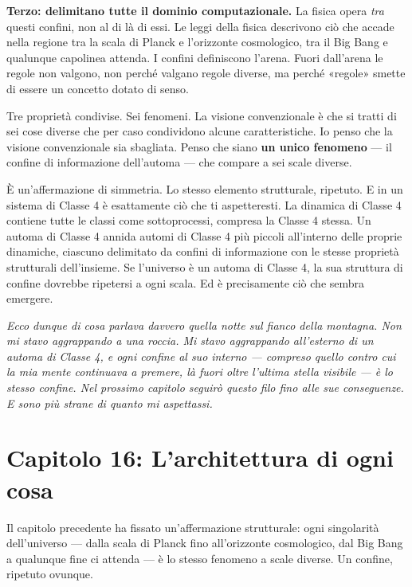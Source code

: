 \documentclass[11pt, twoside, openright]{book}
\begin{document}
\textbf{Terzo: delimitano tutte il dominio computazionale.} La fisica opera \textit{tra} questi confini, non al di là di essi. Le leggi della fisica descrivono ciò che accade nella regione tra la scala di Planck e l'orizzonte cosmologico, tra il Big Bang e qualunque capolinea attenda. I confini definiscono l'arena. Fuori dall'arena le regole non valgono, non perché valgano regole diverse, ma perché «regole» smette di essere un concetto dotato di senso.

Tre proprietà condivise. Sei fenomeni. La visione convenzionale è che si tratti di sei cose diverse che per caso condividono alcune caratteristiche. Io penso che la visione convenzionale sia sbagliata. Penso che siano \textbf{un unico fenomeno} --- il confine di informazione dell'automa --- che compare a sei scale diverse.

È un'affermazione di simmetria. Lo stesso elemento strutturale, ripetuto. E in un sistema di Classe 4 è esattamente ciò che ti aspetteresti. La dinamica di Classe 4 contiene tutte le classi come sottoprocessi, compresa la Classe 4 stessa. Un automa di Classe 4 annida automi di Classe 4 più piccoli all'interno delle proprie dinamiche, ciascuno delimitato da confini di informazione con le stesse proprietà strutturali dell'insieme. Se l'universo è un automa di Classe 4, la sua struttura di confine dovrebbe ripetersi a ogni scala. Ed è precisamente ciò che sembra emergere.


\textit{Ecco dunque di cosa parlava davvero quella notte sul fianco della montagna. Non mi stavo aggrappando a una roccia. Mi stavo aggrappando all'esterno di un automa di Classe 4, e ogni confine al suo interno --- compreso quello contro cui la mia mente continuava a premere, là fuori oltre l'ultima stella visibile --- è lo stesso confine. Nel prossimo capitolo seguirò questo filo fino alle sue conseguenze. E sono più strane di quanto mi aspettassi.}


\chapter*{Capitolo 16: L'architettura di ogni cosa}

Il capitolo precedente ha fissato un'affermazione strutturale: ogni singolarità dell'universo --- dalla scala di Planck fino all'orizzonte cosmologico, dal Big Bang a qualunque fine ci attenda --- è lo stesso fenomeno a scale diverse. Un confine, ripetuto ovunque.
\end{document}
